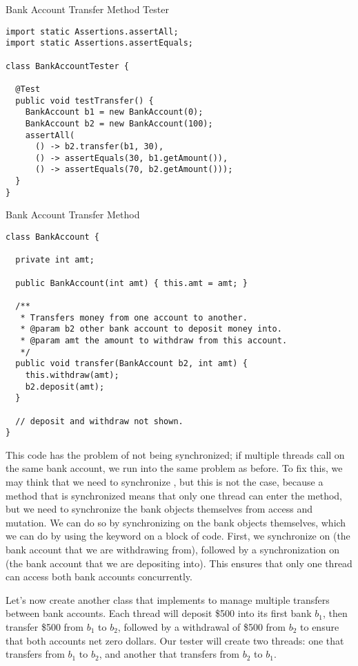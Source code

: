 \begin{cl}{Bank Account Transfer Method Tester}
\begin{lstlisting}[language=MyJava]
import static Assertions.assertAll;
import static Assertions.assertEquals;

class BankAccountTester {

  @Test
  public void testTransfer() {
    BankAccount b1 = new BankAccount(0);
    BankAccount b2 = new BankAccount(100);
    assertAll(
      () -> b2.transfer(b1, 30),
      () -> assertEquals(30, b1.getAmount()),
      () -> assertEquals(70, b2.getAmount()));
  }
}
\end{lstlisting}
\end{cl}

\begin{cl}{Bank Account Transfer Method}
\begin{lstlisting}[language=MyJava]
class BankAccount {

  private int amt;

  public BankAccount(int amt) { this.amt = amt; }

  /**
   * Transfers money from one account to another.
   * @param b2 other bank account to deposit money into.
   * @param amt the amount to withdraw from this account.
   */
  public void transfer(BankAccount b2, int amt) {
    this.withdraw(amt);
    b2.deposit(amt);
  }

  // deposit and withdraw not shown.
}
\end{lstlisting}
\end{cl}

This code has the problem of not being synchronized; if multiple threads call  on the same bank account, we run into the same problem as before. To fix this, we may think that we need to synchronize , but this is not the case, because a method that is synchronized means that only one thread can enter the method, but we need to synchronize the bank objects themselves from access and mutation. We can do so by synchronizing on the bank objects themselves, which we can do by using the  keyword on a block of code. First, we synchronize on  (the bank account that we are withdrawing from), followed by a synchronization on  (the bank account that we are depositing into). This ensures that only one thread can access both bank accounts concurrently.

Let's now create another class that implements  to manage multiple transfers between bank accounts. Each thread will deposit \$500 into its first bank $b_1$, then transfer \$500 from $b_1$ to $b_2$, followed by a withdrawal of \$500 from $b_2$ to ensure that both accounts net zero dollars. Our tester will create two threads: one that transfers from $b_1$ to $b_2$, and another that transfers from $b_2$ to $b_1$.

